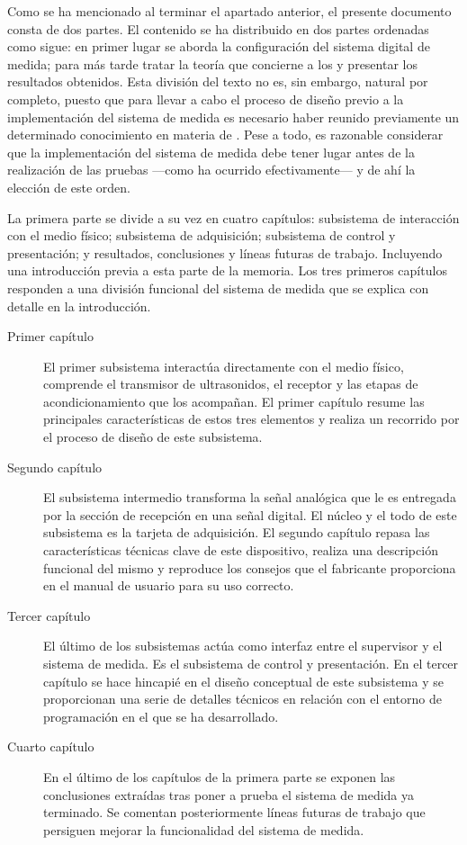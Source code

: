 Como se ha mencionado al terminar el apartado anterior, el presente documento consta de dos partes. El contenido se ha distribuido en dos partes ordenadas como sigue: en primer lugar se aborda la configuración del sistema digital de medida; para más tarde tratar la teoría que concierne a los  y presentar los resultados obtenidos. Esta división del texto no es, sin embargo, natural por completo, puesto que para llevar a cabo el proceso de diseño previo a la implementación del sistema de medida es necesario haber reunido previamente un determinado conocimiento en materia de . Pese a todo, es razonable considerar que la implementación del sistema de medida debe tener lugar antes de la realización de las pruebas ---como ha ocurrido efectivamente--- y de ahí la elección de este orden.\par
La primera parte se divide a su vez en cuatro capítulos: subsistema de interacción con el medio físico; subsistema de adquisición; subsistema de control y presentación; y resultados, conclusiones y líneas futuras de trabajo. Incluyendo una introducción previa a esta parte de la memoria. Los tres primeros capítulos responden a una división funcional del sistema de medida que se explica con detalle en la introducción.

\begin{description}
	\item[Primer capítulo] El primer subsistema interactúa directamente con el medio físico, comprende el transmisor de ultrasonidos, el receptor y las etapas de acondicionamiento que los acompañan. El primer capítulo resume las principales características de estos tres elementos y realiza un recorrido por el proceso de diseño de este subsistema.
	\item[Segundo capítulo] El subsistema intermedio transforma la señal analógica que le es entregada por la sección de recepción en una señal digital. El núcleo y el todo de este subsistema es la tarjeta de adquisición. El segundo capítulo repasa las características técnicas clave de este dispositivo, realiza una descripción funcional del mismo y reproduce los consejos que el fabricante proporciona en el manual de usuario para su uso correcto.
	\item[Tercer capítulo] El último de los subsistemas actúa como interfaz entre el supervisor y el sistema de medida. Es el subsistema de control y presentación. En el tercer capítulo se hace hincapié en el diseño conceptual de este subsistema y se proporcionan una serie de detalles técnicos en relación con el entorno de programación en el que se ha desarrollado.
	\item[Cuarto capítulo] En el último de los capítulos de la primera parte se exponen las conclusiones extraídas tras poner a prueba el sistema de medida ya terminado. Se comentan posteriormente líneas futuras de trabajo que persiguen mejorar la funcionalidad del sistema de medida.
\end{description}

